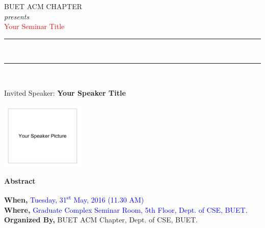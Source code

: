 \documentclass[12pt]{article}
\begin{document}
\begin{center}
    BUET ACM CHAPTER\\
    \textit{presents}\\
    \Huge
    \textcolor{red}{Your Seminar Title}
\end{center}
\rule{\linewidth}{3pt} \\[-0.75\baselineskip]
\rule{\linewidth}{1pt} \\
\begin{minipage}{0.49\textwidth}
\vspace{1cm}
\begin{center}
    {\fontsize{15}{18}\selectfont Invited Speaker: \textbf{Your Speaker Title}}
\end{center}
\begin{center}
	\includegraphics[width=0.3\textwidth]{test.png}
	\\	%
\end{center}
\lipsum[1-1]
\end{minipage}
\begin{minipage}{0.02\textwidth}
\hfill
\end{minipage}
\begin{minipage}{0.49\textwidth}
\vspace{1cm}
\begin{center}
    {\fontsize{15}{18}\selectfont \textbf{Abstract}}
\end{center}
\lipsum[1-2]
\end{minipage}
\begin{center}
    \textbf{When,} \textcolor{blue}{Tuesday, 31\textsuperscript{st} May, 2016 (11.30 AM)}\\
    \textbf{Where,} \textcolor{blue}{Graduate Complex Seminar Room, 5th Floor, Dept. of CSE, BUET.}\\
    \textbf{Organized By,} BUET ACM Chapter, Dept. of CSE, BUET.
\end{center}
\end{document}
